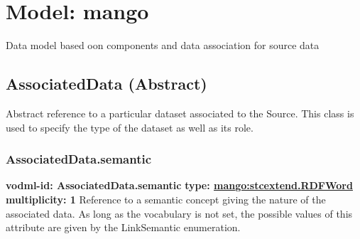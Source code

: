 
%



    
    
    
    
    
    
      

\pagebreak
\section{Model: mango }
  

  Data model based oon components and data association for source data

  \subsection{AssociatedData (Abstract)}
  \label{sect:AssociatedData}
    Abstract reference to a particular dataset associated to the Source. This class is used to specify the type of the dataset as well as its role.

    \subsubsection{AssociatedData.semantic}
      \textbf{vodml-id: AssociatedData.semantic} \newline
      \textbf{type: \hyperref[sect:stcextend.RDFWord]{mango:stcextend.RDFWord}} \newline
      \textbf{multiplicity: 1} \newline 
      Reference to a semantic concept giving the nature of the associated data. As long as the vocabulary is not set, the possible values of this attribute are given by the LinkSemantic enumeration.

